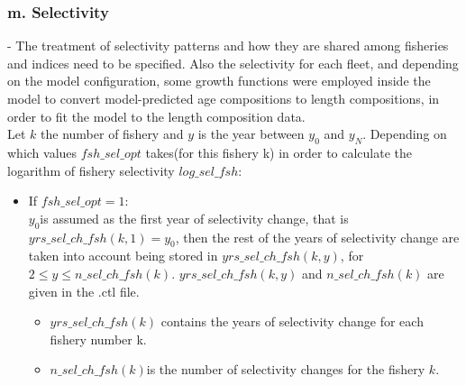 \documentclass{article}
\begin{document}
\subsubsection{m. Selectivity}
- The treatment of selectivity patterns and how they are shared among fisheries and indices need to be specified. Also the selectivity for each fleet, and depending on the model configuration, some growth functions were employed inside the model to convert model-predicted age compositions to length compositions, in order to fit the model to the length composition data.\\

Let $k$ the number of fishery and $y$ is the year between $y_0$ and $y_N$.
Depending on which values $fsh\_sel\_opt$ takes(for this fishery k) in order to calculate the logarithm of fishery selectivity $log\_sel\_fsh$:
\begin{itemize}
\item If $fsh\_sel\_opt=1:$\\

$y_0$is assumed as the first year of selectivity change, that is $yrs\_sel\_ch\_fsh(k,1)=y_0$, then the rest of the years of selectivity change are taken into account being stored in $yrs\_sel\_ch\_fsh(k,y)$, for $2\leq y \leq n\_sel\_ch\_fsh(k)$. $yrs\_sel\_ch\_fsh(k,y)$ and $n\_sel\_ch\_fsh(k)$  are given in the .ctl file.
\begin{itemize}
    \item $yrs\_sel\_ch\_fsh(k)$ contains the years of selectivity change for each fishery number k.
    \item $n\_sel\_ch\_fsh(k)$is the number of selectivity changes for the fishery $k$.
    
\end{itemize}



\end{itemize}
\end{document}
